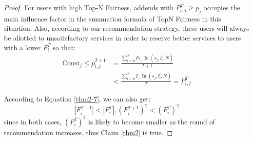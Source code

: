\begin{proof}
For users with high Top-N Fairness, addends with $P_{i, j}^{T} \geqslant p_{j}$ occupies the main influence factor in the summation formula of TopN Fairness in this situation. Also, according to our recommendation strategy, these users will always be allotted to unsatisfactory services in order to reserve better services to users with a lower $F_i^T$ so that:
\begin{equation}
\begin{aligned}
\text {Const}_{j} \leqslant p_{i, j}^{T+1} &=\frac{\sum_{t=0}^{T} I s_{-} \operatorname{In}\left(s_{j}, l_{i}^{t}, N\right)}{T+1} \\
&<\frac{\sum_{t=0}^{T} I_{-} \operatorname{In}\left(s_{j}, l_{i}^{t}, N\right)}{T}=P_{i, j}^{T}
\end{aligned}
\label{thm2-11}
\end{equation}


According to Equation \ref{thm2-7}, we can also get:
\begin{equation}
\left|F_{i}^{T+1}\right|<\left|F_{i}^{T}\right|,\left(F_{i}^{T+1}\right)^{2}<\left(F_{i}^{T}\right)^{2}
\label{thm2-12}
\end{equation}
since in both cases, $\left(F_{i}^{T}\right)^{2}$ is likely to become smaller as the round of recommendation increases, thus Claim \ref{thm2} is true.

\end{proof}